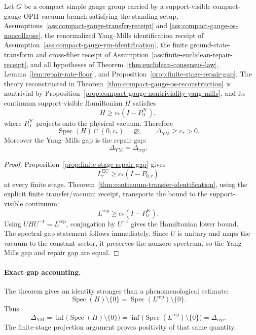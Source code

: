 \begin{theorem}
\label{thm:oph-yang-mills-gap}
Let \(G\) be a compact simple gauge group carried by a support-visible compact-gauge OPH vacuum
branch satisfying the standing setup, Assumptions~\ref{ass:compact-gauge-transfer-receipt} and
\ref{ass:compact-gauge-os-noncollapse}, the renormalized Yang--Mills identification receipt
of Assumption~\ref{ass:compact-gauge-ym-identification}, the finite ground-state-transform and cross-fiber receipt
of Assumption~\ref{ass:finite-euclidean-repair-receipt}, and all hypotheses of
Theorem~\ref{thm:euclidean-consensus-law},
Lemma~\ref{lem:repair-rate-floor}, and
Proposition~\ref{prop:finite-stage-repair-gap}. The theory reconstructed in
Theorem~\ref{thm:compact-gauge-os-reconstruction} is nontrivial by
Proposition~\ref{prop:compact-gauge-nontriviality-yang-mills}, and its continuum support-visible
Hamiltonian \(H\)
satisfies
\[
H\ge c_*(I-P_0^{\mathcal H}),
\]
where \(P_0^{\mathcal H}\) projects onto the physical vacuum. Therefore
\[
\operatorname{Spec}(H)\cap(0,c_*)=\varnothing,
\qquad
\Delta_{\mathrm{YM}}\ge c_*>0.
\]
Moreover the Yang--Mills gap is the repair gap:
\[
\Delta_{\mathrm{YM}}=\Delta_{\mathrm{rep}}.
\]
\end{theorem}

\begin{proof}
Proposition~\ref{prop:finite-stage-repair-gap} gives
\[
L_r^{\mathrm{EC}}\ge c_*(I-P_{0,r})
\]
at every finite stage. Theorem~\ref{thm:continuum-transfer-identification}, using the explicit
finite transfer/vacuum receipt, transports the bound to the support-visible continuum:
\[
L^{\mathrm{rep}}\ge c_*(I-P_0^K).
\]
Using \(UHU^{-1}=L^{\mathrm{rep}}\), conjugation by \(U^{-1}\) gives the Hamiltonian lower bound.
The spectral-gap statement follows immediately. Since \(U\) is unitary and maps the vacuum to the
constant sector, it preserves the nonzero spectrum, so the Yang--Mills gap and repair gap are
equal.
\end{proof}

\paragraph{Exact gap accounting.}
The theorem gives an identity stronger than a phenomenological estimate:
\[
\operatorname{Spec}(H)\setminus\{0\}
=
\operatorname{Spec}(L^{\mathrm{rep}})\setminus\{0\}.
\]
Thus
\[
\Delta_{\mathrm{YM}}
=
\inf\bigl(\operatorname{Spec}(H)\setminus\{0\}\bigr)
=
\inf\bigl(\operatorname{Spec}(L^{\mathrm{rep}})\setminus\{0\}\bigr)
=
\Delta_{\mathrm{rep}}.
\]
The finite-stage projection argument proves positivity of that same quantity.

